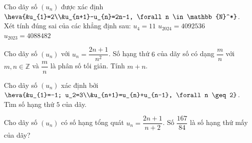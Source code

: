 \begin{ex}%
 Cho dãy số $(u_{n})$ được xác định $\heva{&u_{1}=2\\&u_{n+1}-u_{n}=2n-1,  \forall n \in \mathbb{N}^*}$.\\
 Xét tính đúng sai của các khẳng  định sau:
   {\True $u_{4} =11$}
   {$u_{2024} =4092536$}
  {$u_{2023} =4088482$} 
\end{ex}


\begin{ex}%
	Cho dãy số $(u_{n})$ với $u_{n} =\dfrac{2n+1}{n^{2}}$. Số hạng thứ $6$ của dãy số có dạng $\dfrac{m}{n}$ với $m,n\in\mathbb{Z}$ và $\dfrac{m}{n}$ là phân số tối giản. Tính $m+n$. 
\end{ex}

\begin{ex}%
	Cho dãy số  $(u_{n})$ xác định bởi $\heva{&u_{1}=-1; u_2=3\\&u_{n+1}=u_{n}+u_{n-1}, \forall n \geq 2}$. Tìm số hạng thứ $5$ của dãy.
\end{ex}

\begin{ex}%
	Cho dãy số $(u_{n})$ có số hạng tổng quát $u_{n}=\dfrac{2n+1}{n+2}$. Số $\dfrac{167}{84}$  là số hạng thứ mấy của dãy?
\end{ex}

